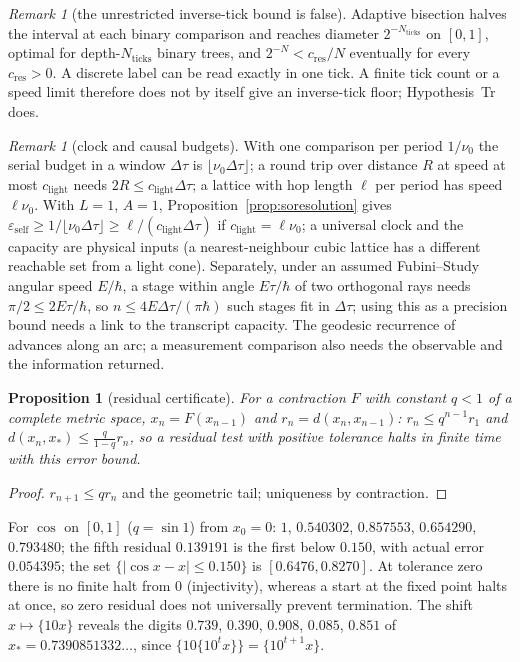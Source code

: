 \documentclass[aps,pra,onecolumn,superscriptaddress,nofootinbib,10pt]{revtex4-2}
\newtheorem{proposition}[theorem]{Proposition}
\theoremstyle{definition}
\theoremstyle{remark}
\newtheorem{remark}[theorem]{Remark}
\begin{document}
\begin{remark}[the unrestricted inverse-tick bound is false]\label{rem:sobisection}
Adaptive bisection halves the interval at each binary comparison and reaches diameter $2^{-N_{\mathrm{ticks}}}$ on $[0,1]$,
optimal for depth-$N_{\mathrm{ticks}}$ binary trees, and $2^{-N}<c_{\mathrm{res}}/N$ eventually for every $c_{\mathrm{res}}>0$.  A discrete label can be
read exactly in one tick.  A finite tick count or a speed limit therefore does not by itself give an
inverse-tick floor; Hypothesis~Tr does.
\end{remark}

\begin{remark}[clock and causal budgets]\label{rem:soclock}
With one comparison per period $1/\nu_0$ the serial budget in a window $\Delta\tau$ is $\lfloor\nu_0\Delta\tau\rfloor$; a round trip over distance $R$
at speed at most $c_{\mathrm{light}}$ needs $2R\le c_{\mathrm{light}}\Delta\tau$; a lattice with hop length $\ell$ per period has speed $\ell\nu_0$.  With $L=1$, $A=1$,
Proposition~\ref{prop:soresolution} gives $\varepsilon_{\mathrm{self}}\ge1/\lfloor\nu_0\Delta\tau\rfloor\ge\ell/(c_{\mathrm{light}}\Delta\tau)$ if $c_{\mathrm{light}}=\ell\nu_0$; a universal clock and the
capacity are physical inputs (a nearest-neighbour cubic lattice has a different reachable set from a light
cone).  Separately, under an assumed Fubini--Study angular speed $E/\hbar$, a stage within angle $E\tau/\hbar$ of two
orthogonal rays needs $\pi/2\le2E\tau/\hbar$, so $n\le4E\Delta\tau/(\pi\hbar)$ such stages fit in $\Delta\tau$; using this as a precision bound
needs a link to the transcript capacity.  The geodesic recurrence of \cite[Thm.~6.2]{PaperI} advances along
an arc; a measurement comparison also needs the observable and the information returned.
\end{remark}

\begin{proposition}[residual certificate]\label{prop:soresidual}
For a contraction $F$ with constant $q<1$ of a complete metric space, $x_n=F(x_{n-1})$ and $r_n=d(x_n,x_{n-1})$: $r_n\le q^{n-1}r_1$
and $d(x_n,x_*)\le\frac q{1-q}r_n$, so a residual test with positive tolerance halts in finite time with this error bound.
\end{proposition}
\begin{proof}
$r_{n+1}\le qr_n$ and the geometric tail; uniqueness by contraction.
\end{proof}
\noindent For $\cos$ on $[0,1]$ ($q=\sin1$) from $x_0=0$: $1$, $0.540302$, $0.857553$, $0.654290$, $0.793480$; the fifth residual $0.139191$ is the
first below $0.150$, with actual error $0.054395$; the set $\{\lvert\cos x-x\rvert\le0.150\}$ is $[0.6476,0.8270]$.  At tolerance zero there is
no finite halt from $0$ (injectivity), whereas a start at the fixed point halts at once, so zero residual does
not universally prevent termination.  The shift $x\mapsto\{10x\}$ reveals the digits $0.739$, $0.390$, $0.908$, $0.085$, $0.851$ of
$x_*=0.7390851332\ldots$, since $\{10\{10^tx\}\}=\{10^{t+1}x\}$.
\end{document}

